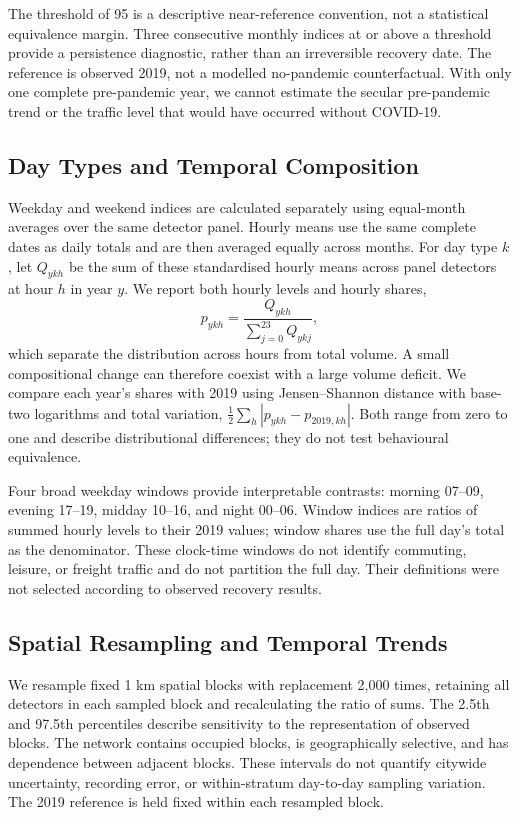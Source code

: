 \documentclass[]{interact}
\begin{document}
The threshold of 95 is a descriptive near-reference convention, not a statistical equivalence margin. Three consecutive monthly indices at or above a threshold provide a persistence diagnostic, rather than an irreversible recovery date. The reference is observed 2019, not a modelled no-pandemic counterfactual. With only one complete pre-pandemic year, we cannot estimate the secular pre-pandemic trend or the traffic level that would have occurred without COVID-19.

\subsection{Day Types and Temporal Composition}
Weekday and weekend indices are calculated separately using equal-month averages over the same detector panel. Hourly means use the same complete dates as daily totals and are then averaged equally across months. For day type $k$, let $Q_{ykh}$ be the sum of these standardised hourly means across panel detectors at hour $h$ in year $y$. We report both hourly levels and hourly shares,
\begin{equation}
 p_{ykh}=\frac{Q_{ykh}}{\sum_{j=0}^{23}Q_{ykj}},
\end{equation}
which separate the distribution across hours from total volume. A small compositional change can therefore coexist with a large volume deficit. We compare each year's shares with 2019 using Jensen--Shannon distance with base-two logarithms and total variation, $\tfrac12\sum_h|p_{ykh}-p_{2019,kh}|$. Both range from zero to one and describe distributional differences; they do not test behavioural equivalence.

Four broad weekday windows provide interpretable contrasts: morning 07--09, evening 17--19, midday 10--16, and night 00--06. Window indices are ratios of summed hourly levels to their 2019 values; window shares use the full day's total as the denominator. These clock-time windows do not identify commuting, leisure, or freight traffic and do not partition the full day. Their definitions were not selected according to observed recovery results.

\subsection{Spatial Resampling and Temporal Trends}
We resample fixed 1 km spatial blocks with replacement 2,000 times, retaining all detectors in each sampled block and recalculating the ratio of sums. The 2.5th and 97.5th percentiles describe sensitivity to the representation of observed blocks. The network contains \PanelBlocks{} occupied blocks, is geographically selective, and has dependence between adjacent blocks. These intervals do not quantify citywide uncertainty, recording error, or within-stratum day-to-day sampling variation. The 2019 reference is held fixed within each resampled block.
\end{document}
